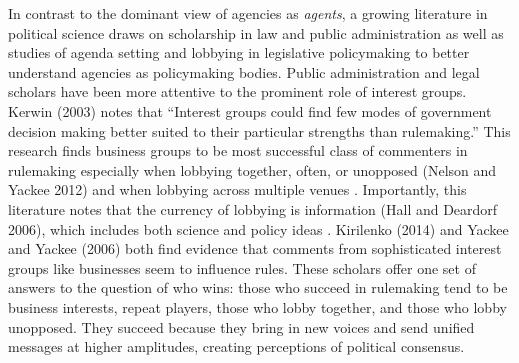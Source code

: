 In contrast to the dominant view of agencies as \textit{agents}, a growing literature in political science draws on scholarship in law and public administration as well as studies of agenda setting and lobbying in legislative policymaking to better understand agencies as policymaking bodies. Public administration and legal scholars have been more attentive to the prominent role of interest groups.  Kerwin (2003) notes that ``Interest groups could find few modes of government decision making better suited to their particular strengths than rulemaking.'' This research finds business groups to be most successful class of commenters in rulemaking \citep{Yackee2006a} especially when lobbying together, often, or unopposed (Nelson and Yackee 2012) and when lobbying across multiple venues \citep{Yackee2015}. Importantly, this literature notes that the currency of lobbying is information (Hall and Deardorf 2006), which includes both science and policy ideas \citep{Jones2005}. Kirilenko (2014) and Yackee and Yackee (2006) both find evidence that comments from sophisticated interest groups like businesses seem to influence rules. These scholars offer one set of answers to the question of who wins: those who succeed in rulemaking tend to be business interests, repeat players, those who lobby together, and those who lobby unopposed. They succeed because they bring in new voices and send unified messages at higher amplitudes, creating perceptions of political consensus.




